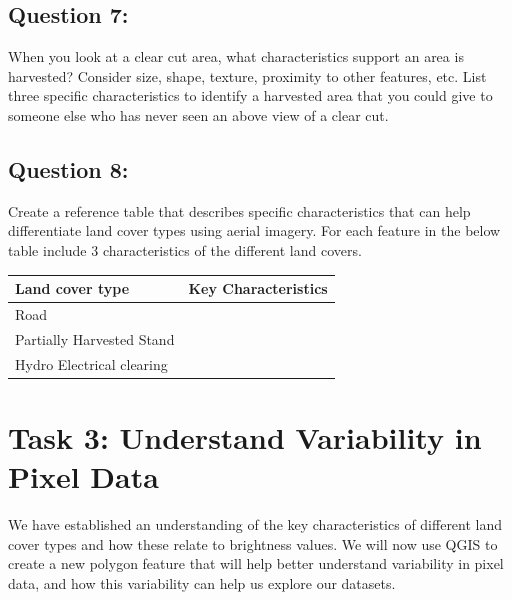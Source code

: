\documentclass[
  letterpaper,
]{book}
\begin{document}
\hypertarget{question-7}{%
\subsection*{Question 7:}\label{question-7}}

When you look at a clear cut area, what characteristics support an area
is harvested? Consider size, shape, texture, proximity to other
features, etc. List three specific characteristics to identify a
harvested area that you could give to someone else who has never seen an
above view of a clear cut.

\hypertarget{question-8-1}{%
\subsection*{Question 8:}\label{question-8-1}}

Create a reference table that describes specific characteristics that
can help differentiate land cover types using aerial imagery. For each
feature in the below table include 3 characteristics of the different
land covers.

\begin{longtable}[]{@{}ll@{}}
\toprule\noalign{}
Land cover type & Key Characteristics \\
\midrule\noalign{}
\endhead
\bottomrule\noalign{}
\endlastfoot
Road & \\
Partially Harvested Stand & \\
Hydro Electrical clearing & \\
\end{longtable}

\hypertarget{task-3-understand-variability-in-pixel-data}{%
\section*{Task 3: Understand Variability in Pixel
Data}\label{task-3-understand-variability-in-pixel-data}}


We have established an understanding of the key characteristics of
different land cover types and how these relate to brightness values. We
will now use QGIS to create a new polygon feature that will help better
understand variability in pixel data, and how this variability can help
us explore our datasets.
\end{document}
